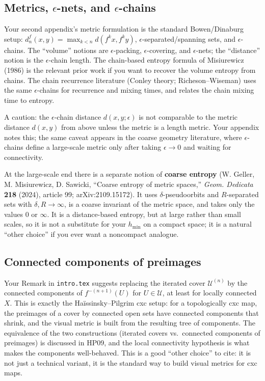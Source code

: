 \documentclass[
]{article}
\begin{document}
\subsection{\texorpdfstring{Metrics, \(\epsilon\)-nets, and
\(\epsilon\)-chains}{Metrics, \textbackslash epsilon-nets, and \textbackslash epsilon-chains}}\label{metrics-epsilon-nets-and-epsilon-chains}

Your second appendix's metric formulation is the standard Bowen/Dinaburg
setup: \(d_n^f(x,y)=\max_{k<n}d(f^k x,f^k y)\),
\(\epsilon\)-separated/spanning sets, and \(\epsilon\)-chains. The
``volume'' notions are \(\epsilon\)-packing, \(\epsilon\)-covering, and
\(\epsilon\)-nets; the ``distance'' notion is the \(\epsilon\)-chain
length. The chain-based entropy formula of Misiurewicz (1986) is the
relevant prior work if you want to recover the volume entropy from
chains. The chain recurrence literature (Conley theory;
Richeson--Wiseman) uses the same \(\epsilon\)-chains for recurrence and
mixing times, and relates the chain mixing time to entropy.

A caution: the \(\epsilon\)-chain distance \(d(x,y;\epsilon)\) is not
comparable to the metric distance \(d(x,y)\) from above unless the
metric is a length metric. Your appendix notes this; the same caveat
appears in the coarse geometry literature, where \(\epsilon\)-chains
define a large-scale metric only after taking \(\epsilon\to0\) and
waiting for connectivity.

At the large-scale end there is a separate notion of \textbf{coarse
entropy} (W. Geller, M. Misiurewicz, D. Sawicki, ``Coarse entropy of
metric spaces,'' \emph{Geom. Dedicata} \textbf{218} (2024), article 99;
arXiv:2109.15172). It uses \(\delta\)-pseudoorbits and \(R\)-separated
sets with \(\delta,R\to\infty\), is a coarse invariant of the metric
space, and takes only the values \(0\) or \(\infty\). It is a
distance-based entropy, but at large rather than small scales, so it is
not a substitute for your \(h_{\min}\) on a compact space; it is a
natural ``other choice'' if you ever want a noncompact analogue.

\subsection{Connected components of
preimages}\label{connected-components-of-preimages}

Your Remark in \texttt{intro.tex} suggests replacing the iterated cover
\(\mathcal U^{(n)}\) by the connected components of \(f^{-(n+1)}(U)\)
for \(U\in\mathcal U\), at least for locally connected \(X\). This is
exactly the Ha\"{i}ssinsky--Pilgrim cxc setup: for a topologically cxc
map, the preimages of a cover by connected open sets have connected
components that shrink, and the visual metric is built from the
resulting tree of components. The equivalence of the two constructions
(iterated covers vs.~connected components of preimages) is discussed in
HP09, and the local connectivity hypothesis is what makes the components
well-behaved. This is a good ``other choice'' to cite: it is not just a
technical variant, it is the standard way to build visual metrics for
cxc maps.
\end{document}
